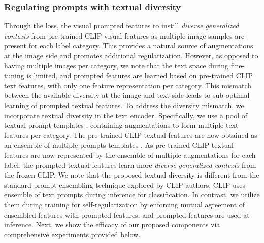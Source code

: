 \documentclass[10pt,twocolumn,letterpaper]{article}
\begin{document}
\subsubsection{Regulating prompts with textual diversity}
\label{textual_diversity_para}
Through the  loss, the visual prompted features to instill \textit{diverse generalized contexts} from pre-trained CLIP visual features as multiple image samples are present for each label category. This provides a natural source of augmentations at the image side and promotes additional regularization. However, as opposed to having multiple images per category, we note that the text space during fine-tuning is limited, and prompted features are learned based on pre-trained CLIP text features, with only one feature representation per category. This mismatch between the available diversity at the image and text side leads to sub-optimal learning of prompted textual features. To address the diversity mismatch, we incorporate textual diversity in the text encoder. Specifically, we use a pool of textual prompt templates , containing  augmentations to form multiple text features per category. The pre-trained CLIP textual features are now obtained as an ensemble of multiple prompts templates . As pre-trained CLIP textual features are now represented by the ensemble of multiple augmentations for each label, the prompted textual features learn more \textit{diverse generalized contexts} from the frozen CLIP. We note that the proposed textual diversity is different from the standard prompt ensembling technique explored by CLIP authors. CLIP uses ensemble of text prompts during inference for classification. In contrast, we utilize them during training for self-regularization by enforcing mutual agreement of ensembled features with prompted features, and prompted features are used at inference. Next, we show the efficacy of our proposed components via comprehensive experiments provided below.
\end{document}
